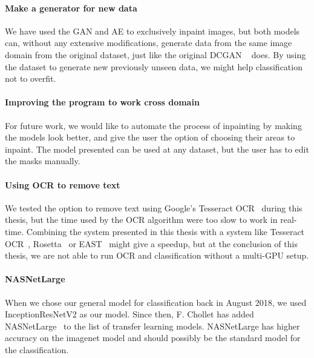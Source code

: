 
\paragraph{Make a generator for new data}
We have used the GAN and AE to exclusively inpaint images, but both models can, without any extensive modifications,  generate data from the same image domain from the original dataset, just like the original DCGAN ~\cite{DBLP:journals/corr/RadfordMC15} does.  
By using the dataset to generate new previously unseen data, we might help classification not to overfit.

\paragraph{Improving the program to work cross domain}
For future work, we would like to automate the process of inpainting by making the models look better, and give the user the option of choosing their areas to inpaint. The model presented can be used at any dataset, but the user has to edit the masks manually. 

\paragraph{Using OCR to remove text}
We tested the option to remove text using Google's Tesseract OCR~\cite{smith2007overview} during this thesis, but the time used by the OCR algorithm were too slow to work in real-time. Combining the system presented in this thesis with a system like  Tesseract OCR~\cite{smith2007overview}, Rosetta~\cite{borisyuk2018rosetta} or EAST~\cite{DBLP:journals/corr/ZhouYWWZHL17} might give a speedup, but at the conclusion of this thesis, we are not able to run OCR and classification without a multi-GPU setup.


\paragraph{NASNetLarge}
When we chose our general model for classification back in August 2018, we used InceptionResNetV2 as our model. Since then, F. Chollet has added NASNetLarge~\cite{DBLP:journals/corr/ZophVSL17} to the list of transfer learning models. NASNetLarge has higher accuracy on the imagenet model and should possibly be the standard model for the classification.


